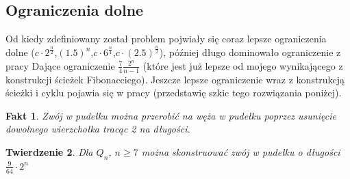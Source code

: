 \documentclass{pracamgr}
\newtheorem{theorem}{Twierdzenie}[chapter]
\newtheorem{fact}[theorem]{Fakt}
\begin{document}
    \subsection{Ograniczenia dolne}
     Od kiedy zdefiniowany został problem pojwiały się coraz lepsze ograniczenia dolne
     ($c\cdot2^{\frac{n}{2}}$,$(1.5)^{n}$,$c\cdot6^{\frac{n}{4}}$,$c\cdot(2.5)^{\frac{n}{2}}$), później długo dominowało ograniczenie z pracy \cite{Snake1}
     Dające ograniczenie $\frac{7}{4}\frac{2^n}{n-1}$ (które jest już lepsze od mojego wynikającego z konstrukcji ścieżek Fibonacciego).\newline
     Jeszcze lepsze ograniczenie wraz z konstrukcją ścieżki i cyklu pojawia się w pracy \cite{Snake2} (przedstawię szkic tego rozwiązania poniżej).
     \begin{fact}
      Zwój w pudełku można przerobić na węża w pudełku poprzez usunięcie dowolnego wierzchołka tracąc 2 na długości.
     \end{fact}
     \begin{theorem}\label{snake 9/64 2^n}
      Dla $Q_n$, $n\ge7$ można skonstruować zwój w pudełku o długości $\frac{9}{64}\cdot2^n$
     \end{theorem}
\end{document}
